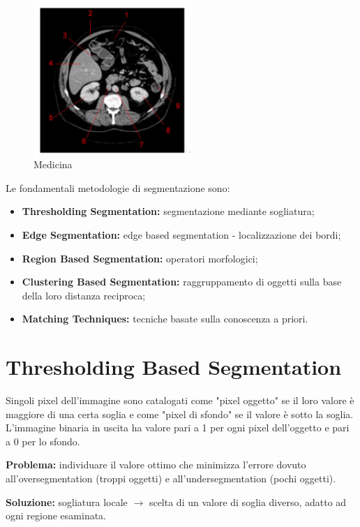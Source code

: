 \begin{figure}[H]
    \centering
    \includegraphics[width=6cm, keepaspectratio]{capitoli/immagini/imgs/medicina.png}
    \caption{Medicina}
\end{figure}


Le fondamentali metodologie di segmentazione sono:
\begin{itemize}
    \item \textbf{Thresholding Segmentation:} segmentazione mediante sogliatura;
    \item \textbf{Edge Segmentation:} edge based segmentation - localizzazione
          dei bordi;
    \item \textbf{Region Based Segmentation:} operatori morfologici;
    \item \textbf{Clustering Based Segmentation:} raggruppamento di oggetti
          sulla base della loro distanza reciproca;
    \item \textbf{Matching Techniques:} tecniche basate sulla conoscenza a
          priori.
\end{itemize}

\section{Thresholding Based Segmentation}

Singoli pixel dell'immagine sono catalogati come "pixel oggetto" se il loro
valore è maggiore di una certa soglia e come "pixel di sfondo" se il valore è
sotto la soglia. L'immagine binaria in uscita ha valore pari a 1 per ogni pixel
dell'oggetto e pari a 0 per lo sfondo.

\begin{trivlist}
    \item \textbf{Problema:} individuare il valore ottimo che minimizza l'errore
    dovuto all'oversegmentation (troppi oggetti) e all'undersegmentation (pochi
    oggetti).
    \item \textbf{Soluzione:} sogliatura locale $\rightarrow$ scelta di un
    valore di soglia diverso, adatto ad ogni regione esaminata.
\end{trivlist}

